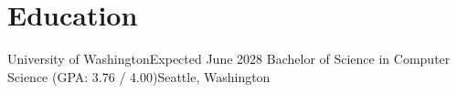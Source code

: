 \section{Education}
    \resumeSubHeadingListStart

    \resumeSubheading
    {University of Washington}{Expected June 2028}
    {Bachelor of Science in Computer Science (GPA: 3.76 / 4.00)}{Seattle, Washington}
    \resumeItemListStart
    \resumeItemListEnd

    \resumeSubHeadingListEnd
